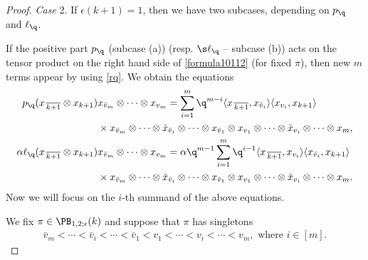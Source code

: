 \begin{proof}
\smallskip\noindent
\emph{Case} 2. If $\epsilon(k+1)=1$, then we have two subcases, depending on $p_\q$ and $\ell_{\q}$.

If the positive part $p_\q $ (subcase (a)) (resp. $\s \ell_{\q}$ -- subcase (b)) acts on the tensor product on the right hand side of \eqref{formula10112} (for fixed $\pi$), then new $m$ terms appear by using \eqref{rq}. We obtain the equations
\begin{subequations}
\begin{align}
	\begin{split}
		p_\q(x_{\,\overline{k+1}}\otimes x_{k+1}) & x_{\bar v_m}\otimes \cdots \otimes x_{v_m}=
		\sum_{i=1}^m \q^{m-i}\langle x_{\,\overline{k+1}},x_{\bar v_i}\rangle \langle x_{v_i} ,x_{k+1}\rangle\, \\ &\times x_{\bar v_m }\otimes \cdots \otimes \check{x}_{\bar v_i} \otimes \cdots \otimes x_{\bar v_1} \otimes x_{v_1}\otimes \cdots \otimes \check{x}_{v_i} \otimes \cdots \otimes x_m,
	\end{split}\label{eq:equatinpomocdowodgolwny1}
	\\
	\begin{split}
		\alpha\ell_\q(x_{\,\overline{k+1}}\otimes x_{k+1}) & x_{\bar v_m}\otimes \cdots \otimes x_{v_m}=
		\alpha\q^{m-1}\sum_{i=1}^m \q^{i-1}
		\langle x_{\,\overline{k+1}},x_{ v_i}\rangle \langle x_{\bar v_i} ,x_{k+1}\rangle\, \\& \times x_{\bar v_m }\otimes \cdots \otimes \check{x}_{\bar v_i} \otimes \cdots \otimes x_{\bar v_1} \otimes x_{v_1}\otimes \cdots \otimes \check{x}_{v_i} \otimes \cdots \otimes x_m.
	\end{split}\label{eq:equatinpomocdowodgolwny2}
\end{align}
\end{subequations}
Now we will focus on the $i$-th summand of the above equations.

We fix $\pi\in \PB_{1,2;\epsilon}(k)$ and suppose that $\pi$ has singletons
\begin{align*}
\bar v_m<\cdots <\bar v_{ i} < \cdots <\bar v_1 < v_1<\cdots <v_i <\cdots <v_m,\text{ where } i\in [m].
\end{align*}


\end{proof}
